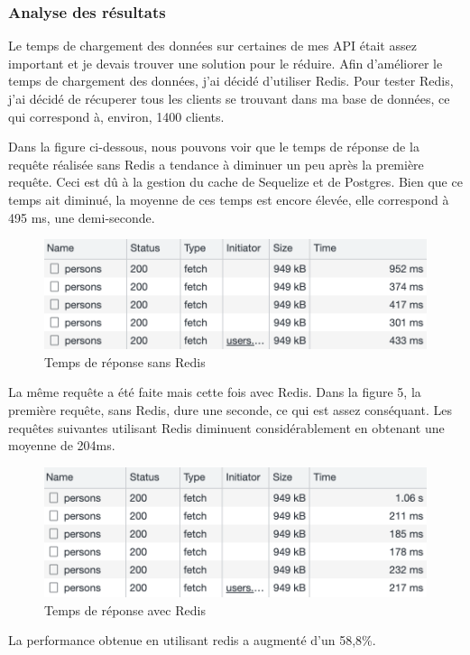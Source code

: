 \subsubsection{Analyse des résultats}
Le temps de chargement des données sur certaines de mes API était assez important et je devais trouver une solution pour le réduire. 
Afin d'améliorer le temps de chargement des données, j'ai décidé d'utiliser Redis. 
Pour tester Redis, j'ai décidé de récuperer tous les clients se trouvant dans ma base de données, ce qui correspond à, environ, 1400 clients.

Dans la figure ci-dessous, nous pouvons voir que le temps de réponse de la requête réalisée sans Redis a tendance à diminuer un peu après la première requête. Ceci est dû à la gestion du cache de Sequelize et de Postgres. Bien que ce temps ait diminué, la moyenne de ces temps est encore élevée, elle correspond à 495 ms, une demi-seconde.
\begin{figure}[H]
    \centering
    \includegraphics[width=\linewidth]{img/sans-redis.png}
    \caption{Temps de réponse sans Redis}
    \label{Sans-Redis}
  \end{figure}
La même requête a été faite mais cette fois avec Redis. Dans la figure 5, la première requête, sans Redis, dure une seconde, ce qui est assez conséquant. Les requêtes suivantes utilisant Redis diminuent considérablement en obtenant une moyenne de 204ms.
\begin{figure}[H]
    \centering
    \includegraphics[width=\linewidth]{img/avec-redis.png}
    \caption{Temps de réponse avec Redis}
    \label{Avec-Redis}
\end{figure}
La performance obtenue en utilisant redis a augmenté d'un 58,8\%.

